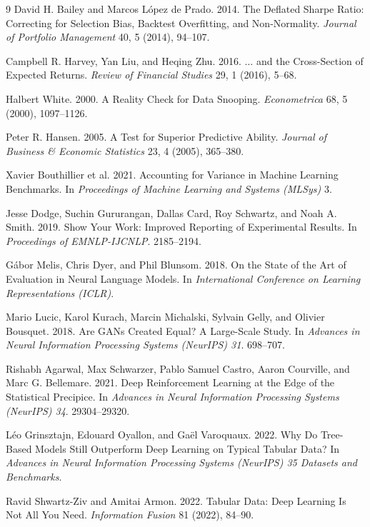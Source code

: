 \documentclass[sigconf,review]{acmart}
\begin{document}
\begin{thebibliography}{9}
David H. Bailey and Marcos L\'opez de Prado. 2014. The Deflated Sharpe Ratio: Correcting for Selection Bias, Backtest Overfitting, and Non-Normality. \textit{Journal of Portfolio Management} 40, 5 (2014), 94--107.

Campbell R. Harvey, Yan Liu, and Heqing Zhu. 2016. $\ldots$ and the Cross-Section of Expected Returns. \textit{Review of Financial Studies} 29, 1 (2016), 5--68.

Halbert White. 2000. A Reality Check for Data Snooping. \textit{Econometrica} 68, 5 (2000), 1097--1126.

Peter R. Hansen. 2005. A Test for Superior Predictive Ability. \textit{Journal of Business \& Economic Statistics} 23, 4 (2005), 365--380.

Xavier Bouthillier et al. 2021. Accounting for Variance in Machine Learning Benchmarks. In \textit{Proceedings of Machine Learning and Systems (MLSys)} 3.

Jesse Dodge, Suchin Gururangan, Dallas Card, Roy Schwartz, and Noah A. Smith. 2019. Show Your Work: Improved Reporting of Experimental Results. In \textit{Proceedings of EMNLP-IJCNLP}. 2185--2194.

G\'abor Melis, Chris Dyer, and Phil Blunsom. 2018. On the State of the Art of Evaluation in Neural Language Models. In \textit{International Conference on Learning Representations (ICLR)}.

Mario Lucic, Karol Kurach, Marcin Michalski, Sylvain Gelly, and Olivier Bousquet. 2018. Are GANs Created Equal? A Large-Scale Study. In \textit{Advances in Neural Information Processing Systems (NeurIPS) 31}. 698--707.

Rishabh Agarwal, Max Schwarzer, Pablo Samuel Castro, Aaron Courville, and Marc G. Bellemare. 2021. Deep Reinforcement Learning at the Edge of the Statistical Precipice. In \textit{Advances in Neural Information Processing Systems (NeurIPS) 34}. 29304--29320.

L\'eo Grinsztajn, Edouard Oyallon, and Ga\"el Varoquaux. 2022. Why Do Tree-Based Models Still Outperform Deep Learning on Typical Tabular Data? In \textit{Advances in Neural Information Processing Systems (NeurIPS) 35 Datasets and Benchmarks}.

Ravid Shwartz-Ziv and Amitai Armon. 2022. Tabular Data: Deep Learning Is Not All You Need. \textit{Information Fusion} 81 (2022), 84--90.


\end{thebibliography}
\end{document}
